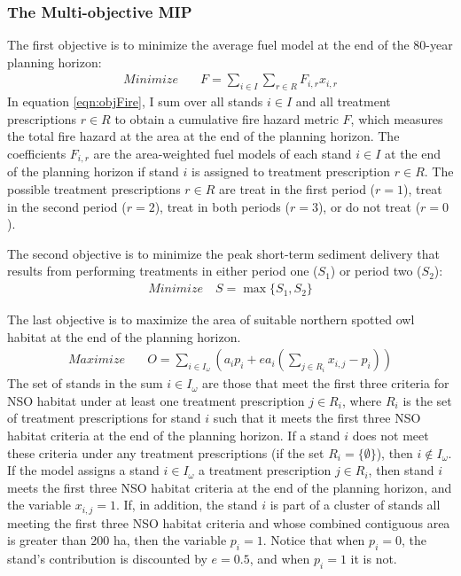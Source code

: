 \subsubsection{The Multi-objective MIP}
The first objective is to minimize the average fuel model at the end of the 80-year planning horizon:
\begin{align}
Minimize \quad & F = \sum_{i\in I} \sum_{r\in R} F_{i,r} x_{i,r} \label{eqn:objFire}
\end{align}
In equation \eqref{eqn:objFire}, I sum over all stands $i \in I$ and all treatment prescriptions $r \in R$ to obtain a cumulative fire hazard metric $F$, which measures the total fire hazard at the area at the end of the planning horizon. The coefficients $F_{i,r}$ are the area-weighted fuel models of each stand $i \in I$ at the end of the planning horizon if stand $i$ is assigned to treatment prescription $r \in R$. The possible treatment prescriptions $r \in R$ are treat in the first period ($r=1$), treat in the second period ($r=2$), treat in both periods ($r=3$), or do not treat ($r=0$).

The second objective is to minimize the peak short-term sediment delivery that results from performing treatments in either period one ($S_1$) or period two ($S_2$):
\begin{align}
Minimize \quad S = \max \{S_1,S_2\} \label{eqn:objSediment}
\end{align}

The last objective is to maximize the area of suitable northern spotted owl habitat at the end of the planning horizon.
\begin{align}
Maximize \quad & O = \sum_{i\in I_\omega} \left(a_i p_i + e a_i \left( \sum_{j \in R_i} x_{i,j}-p_i \right) \right) \label{eqn:objOwl}
\end{align}
The set of stands in the sum $i \in I_\omega$ are those that meet the first three criteria for NSO habitat under at least one treatment prescription $j \in R_i$, where $R_i$ is the set of treatment prescriptions for stand $i$ such that it meets the first three NSO habitat criteria at the end of the planning horizon. If a stand $i$ does not meet these criteria under any treatment prescriptions (if the set $R_i = \{\emptyset\}$), then $i \notin I_\omega$. If the model assigns a stand $i \in I_\omega$ a treatment prescription $j \in R_i$, then stand $i$ meets the first three NSO habitat criteria at the end of the planning horizon, and the variable $x_{i,j}=1$. If, in addition, the stand $i$ is part of a cluster of stands all meeting the first three NSO habitat criteria and whose combined contiguous area is greater than 200 ha, then the variable $p_i = 1$. Notice that when $p_i = 0$, the stand's contribution is discounted by $e = 0.5$, and when $p_i = 1$ it is not.

